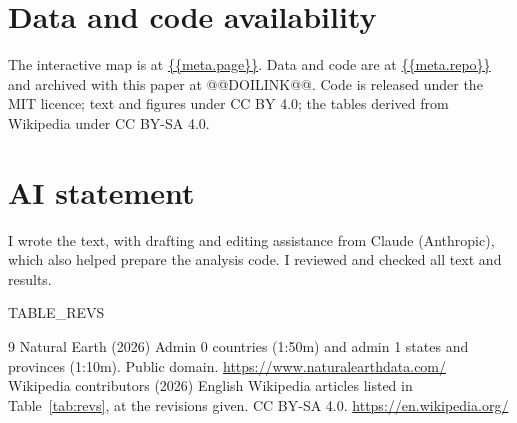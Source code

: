\documentclass[11pt,a4paper]{article}
\begin{document}
\section*{Data and code availability}
The interactive map is at \url{{{meta.page}}}. Data and code are at \url{{{meta.repo}}} and archived with this paper at @@DOILINK@@. Code is released under the MIT licence; text and figures under CC BY 4.0; the tables derived from Wikipedia under CC BY-SA 4.0.

\section*{AI statement}
I wrote the text, with drafting and editing assistance from Claude (Anthropic), which also helped prepare the analysis code. I reviewed and checked all text and results.

{{TABLE_REVS}}

\begin{thebibliography}{9}
 Natural Earth (2026) Admin 0 countries (1:50m) and admin 1 states and provinces (1:10m). Public domain. \url{https://www.naturalearthdata.com/}
 Wikipedia contributors (2026) English Wikipedia articles listed in Table~\ref{tab:revs}, at the revisions given. CC BY-SA 4.0. \url{https://en.wikipedia.org/}
\end{thebibliography}
\end{document}
